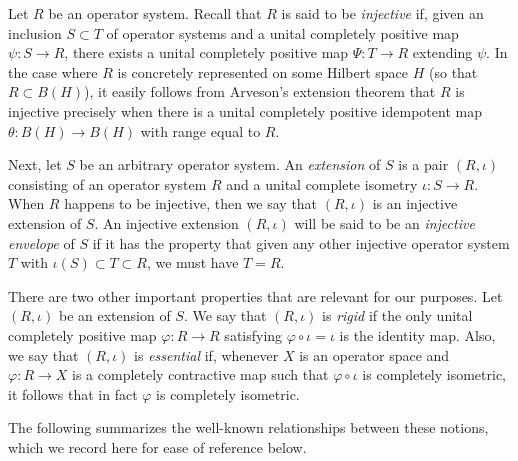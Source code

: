 \documentclass[10pt]{amsart}
\renewcommand{\phi}{\varphi}
\theoremstyle{definition}
\begin{document}
Let $R$ be an operator system. Recall that $R$ is said to be \emph{injective} if, given an inclusion $S\subset T$ of operator systems and a unital completely positive map $\psi:S\to R$, there exists a unital completely positive map $\Psi:T\to R$ extending $\psi$. In the case where $R$ is concretely represented on some Hilbert space $H$ (so that $R\subset B(H)$), it easily follows from Arveson's extension theorem that $R$ is injective precisely when there is a unital completely positive idempotent map $\theta:B(H)\to B(H)$ with range equal to $R$.


Next, let $S$ be an arbitrary operator system. An \emph{extension} of $S$ is a pair $(R,\iota)$ consisting of an operator system $R$ and a unital complete isometry $\iota:S\to R$. When $R$ happens to be injective, then we say that $(R,\iota)$ is an injective extension of $S$.
An injective extension $(R,\iota)$ will be said to be an \emph{injective envelope} of $S$ if it has the property that given any other injective operator system $T$ with $\iota(S)\subset T\subset R$, we must have $T=R$. 

There are two other important properties that are relevant for our purposes. Let $(R,\iota)$ be an extension of $S$. We say that $(R,\iota)$ is \emph{rigid} if the only unital completely positive map $\phi:R\to R$ satisfying $\phi\circ \iota=\iota$ is the identity map. Also, we say that $(R,\iota)$ is \emph{essential} if, whenever $X$ is an operator space and  $\phi:R\to X$ is a completely contractive map such that $\phi\circ\iota$ is completely isometric, it follows that in fact $\phi$ is completely isometric.

The following summarizes the well-known relationships between these notions, which we record here for ease of reference below.
\end{document}
